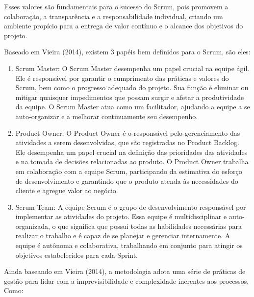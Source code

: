Esses valores são fundamentais para o sucesso do Scrum, pois promovem a colaboração, a transparência e a responsabilidade individual, criando um ambiente propício para a entrega de valor contínuo e o alcance dos objetivos do projeto.

Baseado em Vieira (2014), existem 3 papéis bem definidos para o Scrum, são eles:

\begin{enumerate}
	\item Scrum Master: O Scrum Master desempenha um papel crucial na equipe ágil. Ele é responsável por garantir o cumprimento das práticas e valores do Scrum, bem como o progresso adequado do projeto. Sua função é eliminar ou mitigar quaisquer impedimentos que possam surgir e afetar a produtividade da equipe. O Scrum Master atua como um facilitador, ajudando a equipe a se auto-organizar e a melhorar continuamente seu desempenho.
	\item Product Owner: O Product Owner é o responsável pelo gerenciamento das atividades a serem desenvolvidas, que são registradas no Product Backlog. Ele desempenha um papel crucial na definição das prioridades das atividades e na tomada de decisões relacionadas ao produto. O Product Owner trabalha em colaboração com a equipe Scrum, participando da estimativa do esforço de desenvolvimento e garantindo que o produto atenda às necessidades do cliente e agregue valor ao negócio.
	\item Scrum Team: A equipe Scrum é o grupo de desenvolvimento responsável por implementar as atividades do projeto. Essa equipe é multidisciplinar e auto-organizada, o que significa que possui todas as habilidades necessárias para realizar o trabalho e é capaz de se planejar e gerenciar internamente. A equipe é autônoma e colaborativa, trabalhando em conjunto para atingir os objetivos estabelecidos para cada Sprint.
\end{enumerate}

Ainda baseando em Vieira (2014), a metodologia adota uma série de práticas de gestão para lidar com a imprevisibilidade e complexidade inerentes aos processos. Como:

